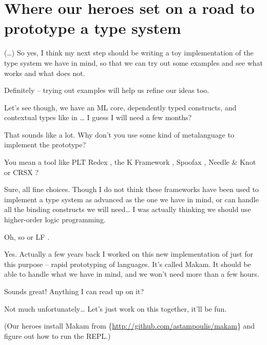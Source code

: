 \section{Where our heroes set on a road to prototype a type
system}\label{where-our-heroes-set-on-a-road-to-prototype-a-type-system}

\heroSTUDENT{} (\ldots{}) So yes, I think my next step should be writing a toy
implementation of the type system we have in mind, so that we can try
out some examples and see what works and what does not.

\heroADVISOR{} Definitely -- trying out examples will help us refine our ideas
too.

\heroSTUDENT{} Let's see though, we have an ML core, dependently typed
constructs, and contextual types like in
\citet{nanevski2008contextual}\ldots{} I guess I will need a few months?

\heroADVISOR{} That sounds like a lot. Why don't you use some kind of
metalanguage to implement the prototype?

\heroSTUDENT{} You mean a tool like PLT Redex \citep{felleisen2009semantics},
the K Framework \citep{rosu2010overview,ellison2009rewriting}, Spoofax
\citep{kats2010spoofax}, Needle \& Knot \citep{keuchel2016needle} or
CRSX \citep{rose2011crsx}?

\heroADVISOR{} Sure, all fine choices. Though I do not think these frameworks
have been used to implement a type system as advanced as the one we have
in mind, or can handle all the binding constructs we will need\ldots{} I
was actually thinking we should use higher-order logic programming.

\heroSTUDENT{} Oh, so \lamprolog \citep{miller1988overview} or LF
\citep{pfenning1999system}.

\heroADVISOR{} Yes. Actually a few years back I worked on this new
implementation of \lamprolog
just for this purpose -- rapid prototyping of languages. It's called
Makam. It should be able to handle what we have in mind, and we won't
need more than a few hours.

\heroSTUDENT{} Sounds great! Anything I can read up on it?

\heroADVISOR{} Not much unfortunately\ldots{} Let's just work on this
together, it'll be fun.

(Our heroes install Makam from
\if@ACM@anonymous\{\url{http://github.com/astampoulis/makam}\}\fi\xspace
and figure out how to run the REPL.)
